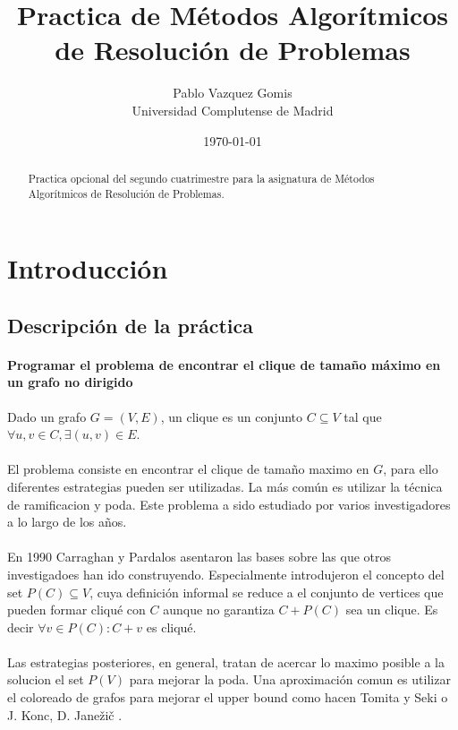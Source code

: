 \documentclass{article}
\title{Practica de Métodos Algorítmicos de Resolución de Problemas}
\author{Pablo Vazquez Gomis  \\
	Universidad Complutense de Madrid \\
	}
\date{\today}
\begin{document}
\maketitle


\begin{abstract}
Practica opcional del segundo cuatrimestre para la asignatura de Métodos Algorítmicos de Resolución de Problemas.
\end{abstract}

\section{Introducción}
\subsection{Descripción de la práctica}
\paragraph{Programar el problema de encontrar el clique de tamaño máximo en un grafo no dirigido} 
Dado un grafo $G = (V, E)$, un clique es un conjunto $C \subseteq V$ tal que $\forall u, v \in C, \exists (u, v) \in E$.
\paragraph{}El problema consiste en encontrar el clique de tamaño maximo en $G$, para ello diferentes estrategias pueden ser utilizadas.
La más común es utilizar la técnica de ramificacion y poda. Este problema a sido estudiado por varios investigadores a lo largo de los años.
\paragraph{}En 1990 Carraghan y Pardalos \cite{car} asentaron las bases sobre las que otros investigadoes han ido construyendo. Especialmente introdujeron el concepto del
set $P(C) \subseteq V$, cuya definición informal se reduce a el conjunto de vertices que pueden formar cliqué con $C$ aunque no garantiza $C + P(C)$ sea un clique. 
Es decir $\forall v \in P(C) : C + v$ es cliqué.
\paragraph{} Las estrategias posteriores, en general, tratan de acercar lo maximo posible a la solucion el set $P(V)$ para mejorar la poda.
Una aproximación comun es utilizar el coloreado de grafos para mejorar el upper bound como hacen Tomita y Seki \cite{tom} o J. Konc, D. Janežič \cite{jonc}. 
\end{document}
